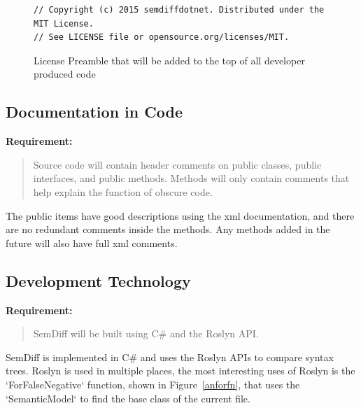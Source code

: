 \documentclass[draftclsnofoot,onecolumn]{IEEEtran}
\begin{document}
\begin{figure}[!htb]
\centering
\begin{lstlisting}
// Copyright (c) 2015 semdiffdotnet. Distributed under the MIT License. 
// See LICENSE file or opensource.org/licenses/MIT.
\end{lstlisting}
\caption{License Preamble that will be added to the top of all developer 
produced code}
\label{mitheader}
\end{figure}

\subsection{Documentation in Code}%

\textbf{Requirement:}

\begin{quote}

Source code will contain header comments on public classes, public 
interfaces, and public methods. Methods will only contain comments that help 
explain the function of obscure code.

\end{quote}

The public items have good descriptions using the xml documentation, and 
there are no redundant comments inside the methods. Any methods added in the 
future will also have full xml comments.

\subsection{Development Technology}%

\textbf{Requirement:}

\begin{quote}

SemDiff will be built using C\# and the Roslyn API.

\end{quote}

SemDiff is implemented in C\# and uses the Roslyn APIs to compare syntax 
trees. Roslyn is used in multiple places, the most interesting uses of Roslyn 
is the `ForFalseNegative` function, shown in Figure~\ref{anforfn}, that uses 
the `SemanticModel` to find the base class of the current file.
\end{document}

